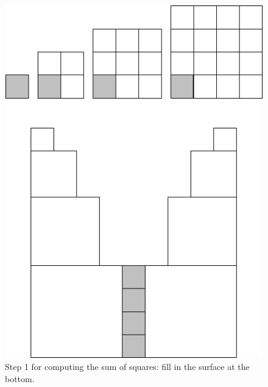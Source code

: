 {\begin{figure}[ht]
\begin{center}
       \includegraphics[scale=0.4]{FiguresMaths/SumSquares2}
\caption{Step 1 for computing the sum of squares: fill in the surface at the bottom.}
       \label{fig:sumSquares2}
\end{center}
\end{figure}
\begin{figure}[ht]
\begin{center}

\end{center}
\end{figure}}
